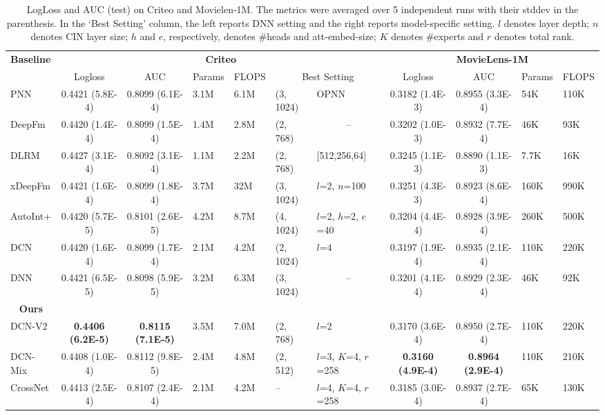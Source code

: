 \documentclass[sigconf]{acmart}
\begin{document}
\begin{table*}[htpb]
\small
\caption{LogLoss and AUC (test) on Criteo and Movielen-1M. The metrics were averaged over 5 independent runs with their stddev in the parenthesis. In the `Best Setting' column, the left reports DNN setting and the right reports model-specific setting. $l$ denotes layer depth; $n$ denotes CIN layer size; $h$ and $e$, respectively, denotes \#heads and att-embed-size; $K$ denotes \#experts and $r$ denotes total rank.}
\vspace{-3ex}
\label{tab:baseline_comparison}
\begin{center}
\begin{tabular}{l|ccp{2.5em}p{2.5em}ll|ccp{2.5em}p{2.5em}}
\toprule
\multirow{ 2}{*}{{\bf Baseline}} & \multicolumn{6}{c|}{\bf Criteo} & \multicolumn{4}{c}{\bf MovieLens-1M} \\
& Logloss  & AUC & Params & FLOPS &  \multicolumn{2}{c|}{Best Setting} &Logloss & AUC  & Params & FLOPS  \\
\midrule
PNN     & 0.4421 (5.8E-4) & 0.8099 (6.1E-4) & 3.1M & 6.1M & (3, 1024) & OPNN
         & 0.3182 (1.4E-3) & 0.8955 (3.3E-4) & 54K & 110K\\
DeepFm  & 0.4420 (1.4E-4) & 0.8099 (1.5E-4) & 1.4M & 2.8M & (2, 768) & \multicolumn{1}{c|}{--}
         & 0.3202 (1.0E-3) & 0.8932 (7.7E-4) & 46K & 93K\\
DLRM    & 0.4427 (3.1E-4) & 0.8092 (3.1E-4) & 1.1M & 2.2M & (2, 768) &  [512,256,64]
         & 0.3245 (1.1E-3) & 0.8890 (1.1E-3) & 7.7K & 16K\\
xDeepFm & 0.4421 (1.6E-4) & 0.8099 (1.8E-4) & 3.7M & 32M & (3, 1024) & $l$=2, $n$=100
         & 0.3251 (4.3E-3) & 0.8923 (8.6E-4) & 160K & 990K\\
AutoInt+ & 0.4420 (5.7E-5) & 0.8101 (2.6E-5) & 4.2M & 8.7M & (4, 1024) & $l$=2, $h$=2, $e$=40
         & 0.3204 (4.4E-4) & 0.8928 (3.9E-4) & 260K & 500K\\
DCN     & 0.4420 (1.6E-4) & 0.8099 (1.7E-4) & 2.1M & 4.2M & (2, 1024) & $l$=4
         & 0.3197 (1.9E-4) & 0.8935 (2.1E-4) & 110K & 220K\\
DNN    & 0.4421 (6.5E-5) & 0.8098 (5.9E-5) & 3.2M & 6.3M & (3, 1024) &  \multicolumn{1}{c|}{--}
         & 0.3201 (4.1E-4) & 0.8929 (2.3E-4) & 46K & 92K\\
\midrule
\multicolumn{1}{c}{\bf Ours}& & & & & & \multicolumn{1}{c}{}& & & &\\
{DCN-V2}  & \bf 0.4406 (6.2E-5) & \bf 0.8115 (7.1E-5) & 3.5M & 7.0M & (2, 768) & $l$=2
         & 0.3170 (3.6E-4) & 0.8950 (2.7E-4) & 110K & 220K \\
{DCN-Mix} & 0.4408 (1.0E-4) & 0.8112 (9.8E-5) & 2.4M & 4.8M  & (2, 512) & $l$=3, $K$=4, $r$=258
         & \bf 0.3160 (4.9E-4) & \bf 0.8964 (2.9E-4) & 110K & 210K \\
CrossNet &0.4413 (2.5E-4) & 0.8107 (2.4E-4) & 2.1M & 4.2M &  -- & $l$=4, $K$=4, $r$=258
         & 0.3185 (3.0E-4) & 0.8937 (2.7E-4) & 65K & 130K \\
\bottomrule
\end{tabular}
\end{center}
\vspace{-5pt}
\end{table*}
\end{document}
